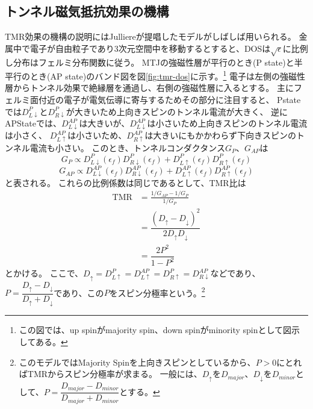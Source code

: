 \documentclass[../../../main]{subfiles}
\begin{document}
\subsection{トンネル磁気抵抗効果の機構}
TMR効果の機構の説明にはJulliereが提唱したモデル\cite{julliere-model}がしばしば用いられる。
金属中で電子が自由粒子であり3次元空間中を移動するとすると、DOSは$\sqrt{\epsilon}$に比例し分布はフェルミ分布関数に従う。
MTJの強磁性層が平行のとき(P state)と半平行のとき(AP state)のバンド図を図\ref{fig:tmr-dos}に示す。\footnote{
	この図では、up spinがmajority spin、down spinがminority spinとして図示してある。
}
電子は左側の強磁性層からトンネル効果で絶縁層を通過し、右側の強磁性層に入るとする。
主にフェルミ面付近の電子が電気伝導に寄与するためその部分に注目すると、
Pstateでは$D^{P}_{L\downarrow}$と$D^{P}_{R\downarrow}$が大きいため上向きスピンのトンネル電流が大きく、
逆にAPStateでは、$D^{AP}_{L\downarrow}$は大きいが、$D^{AP}_{L\downarrow}$は小さいため上向きスピンのトンネル電流は小さく、
$D^{AP}_{L\uparrow}$は小さいため、$D^{AP}_{R\uparrow}$は大きいにもかかわらず下向きスピンのトンネル電流も小さい。
このとき、トンネルコンダクタンス$G_P$、$G_{AP}$は
\begin{equation}\label{eq:tmr-g-p}
	G_P \propto D^{P}_{L\downarrow}(\epsilon_f)D^{P}_{R\downarrow}(\epsilon_f) + D^{P}_{L\uparrow}(\epsilon_f)D^{P}_{R\uparrow}(\epsilon_f)
\end{equation}
\begin{equation}\label{eq:tmr-g-ap}
	G_{AP} \propto D^{AP}_{L\downarrow}(\epsilon_f)D^{AP}_{R\downarrow}(\epsilon_f) + D^{AP}_{L\uparrow}(\epsilon_f)D^{AP}_{R\uparrow}(\epsilon_f)
\end{equation}
と表される。
これらの比例係数は同じであるとして、TMR比は
\begin{align}\label{eq:spin-polarization}
	\textrm{TMR} & = \frac{1/G_{AP} - 1/G_P}{1/G_P} \nonumber                                         \\
	             & = \dfrac{(D_{\uparrow} - D_{\downarrow})^2}{2D_{\uparrow}D_{\downarrow}} \nonumber \\
	             & = \dfrac{2P^2}{1 - P^2}
\end{align}
とかける。
ここで、$D_{\uparrow}=D^{P}_{L\uparrow}=D^{AP}_{L\uparrow}=D^{P}_{R\uparrow}=D^{AP}_{R\downarrow}$などであり、
$P=\dfrac{D_{\uparrow}-D_{\downarrow}}{D_{\uparrow}+D_{\downarrow}}$であり、この$P$をスピン分極率という。\footnote{
このモデルではMajority Spinを上向きスピンとしているから、$P>0$にとればTMRからスピン分極率が求まる。
一般には、$D_{\uparrow}$を$D_{major}$、$D_{\downarrow}$を$D_{minor}$として、$P=\dfrac{D_{major}-D_{minor}}{D_{major}+D_{minor}}$とする。
}
\end{document}
